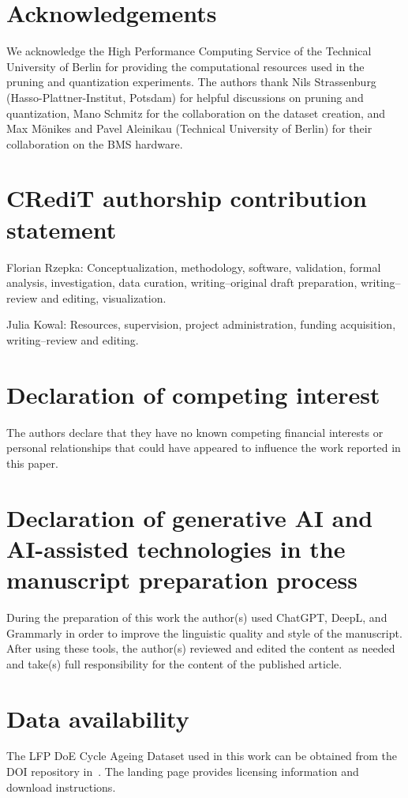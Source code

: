 \documentclass[review]{elsarticle}
\begin{document}
\section*{Acknowledgements}
We acknowledge the High Performance Computing Service of the Technical University of Berlin for providing the computational resources used in the pruning and quantization experiments. The authors thank Nils Strassenburg (Hasso-Plattner-Institut, Potsdam) for helpful discussions on pruning and quantization, Mano Schmitz for the collaboration on the dataset creation, and Max M\"onikes and Pavel Aleinikau (Technical University of Berlin) for their collaboration on the BMS hardware.
\section*{CRediT authorship contribution statement}
Florian Rzepka: Conceptualization, methodology, software, validation, formal analysis, investigation, data curation, writing--original draft preparation, writing--review and editing, visualization.

Julia Kowal: Resources, supervision, project administration, funding acquisition, writing--review and editing.

\section*{Declaration of competing interest}
The authors declare that they have no known competing financial interests or personal relationships that could have appeared to influence the work reported in this paper.
\section*{Declaration of generative AI and AI-assisted technologies in the manuscript preparation process}
During the preparation of this work the author(s) used ChatGPT, DeepL, and Grammarly in order to improve the linguistic quality and style of the manuscript. After using these tools, the author(s) reviewed and edited the content as needed and take(s) full responsibility for the content of the published article.

\section*{Data availability}
The LFP DoE Cycle Ageing Dataset used in this work can be obtained from the DOI repository in~\cite{LFP_DoE_Cycle_Aging_Dataset}. The landing page provides licensing information and download instructions.



\end{document}
